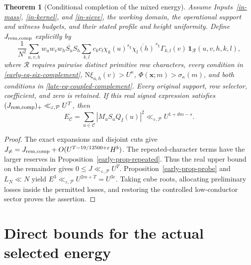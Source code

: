 \documentclass[11pt]{article}
\newtheorem{theorem}{Theorem}[section]
\theoremstyle{definition}
\newcommand{\N}{\mathrm N}
\newcommand{\eps}{\varepsilon}
\newcommand{\Id}{\mathbf 1}
\newcommand{\lls}{\ll_{\eps,\mathcal P}}
\begin{document}
\begin{theorem}[Conditional completion of the mixed energy]\label{thm-completion}
Assume Inputs~\ref{in-mass}, \ref{in-kernel}, and \ref{in-sieve}, the working domain, the operational support and witness budgets, and their stated profile and height uniformity. Define $J_{\rm rem,comp}$ explicitly by
\begin{equation}\label{eq-complete-signed-remainder}
 \frac1{N^2}\sum_{u,v,h}w_uw_vw_h\overline{S_u}S_h
 \sum_{k,l}c_kc_l\chi_k(u)^{s_\chi}
 \overline{\chi_l(h)}^{\,s_\chi}\Gamma_{k,l}(v)\,
 \Id_{\mathcal R}(u,v,h,k,l),
\end{equation}
where $\mathcal R$ requires pairwise distinct primitive row characters, every condition in \eqref{early-eq-six-complement}, $\N\xi_{u,h}(v)>U^\kappa$, $\Phi(\boldsymbol x;m)>\sigma_\kappa(m)$, and both conditions in \eqref{late-eq-coupled-complement}. Every original support, row selector, coefficient, and zero is retained. If this real signed expression satisfies $(J_{\rm rem,comp})_+\lls U^T$, then
\[
 E_{\mathcal C}=\sum_{u\in\mathcal C}|M_uS_uQ_I(u)|^2\lls U^{1+dm-s}.
\]
\end{theorem}
\begin{proof}
The exact expansions and disjoint cuts give $J_{\ne}=J_{\rm rem,comp}+O(U^{T-19/12500+\eps}H^b)$. The repeated-character terms have the larger reserves in Proposition~\ref{early-prop-repeated}. Thus the real upper bound on the remainder gives $0\le J\lls U^T$. Proposition~\ref{early-prop-probe} and $L_N\ll N$ yield $E^3\lls U^{2m+T}=U^{3e}$. Taking cube roots, allocating preliminary losses inside the permitted losses, and restoring the controlled low-conductor sector proves the assertion.
\end{proof}



\section{Direct bounds for the actual selected energy}
\label{sec:direct-energy-fragment}
\end{document}
